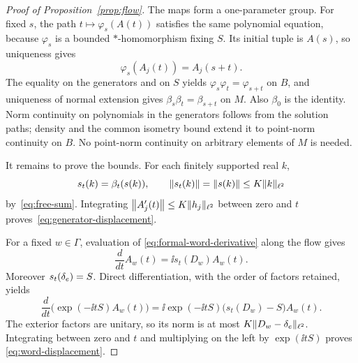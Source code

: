 \begin{proof}[Proof of Proposition~\ref{prop:flow}]
The maps form a one-parameter group. For fixed $s$, the path
$t\mapsto\varphi_s(A(t))$ satisfies the same polynomial
equation, because $\varphi_s$ is a bounded $*$-homomorphism
fixing $S$. Its initial tuple is $A(s)$, so uniqueness gives
\[
 \varphi_s(A_j(t))=A_j(s+t).
\]
The equality on the generators and on $S$ yields
$\varphi_s\varphi_t=\varphi_{s+t}$ on $B$, and uniqueness
of normal extension gives $\beta_s\beta_t=\beta_{s+t}$ on
$M$. Also $\beta_0$ is the identity. Norm continuity on
polynomials in the generators follows from the solution
paths; density and the common isometry bound extend it to
point-norm continuity on $B$. No point-norm continuity on
arbitrary elements of $M$ is needed.

It remains to prove the bounds. For each finitely supported
real $k$,
\[
 s_t(k)=\beta_t(s(k)),\qquad
 \left\lVert s_t(k)\right\rVert=\left\lVert s(k)\right\rVert\leq K\|k\|_{\ell^2}
\]
by~\eqref{eq:free-sum}. Integrating
$\left\lVert A_j'(t)\right\rVert\leq K\|h_j\|_{\ell^2}$ between zero and
$t$ proves~\eqref{eq:generator-displacement}.

For a fixed $w\in\Gamma$, evaluation of
\eqref{eq:formal-word-derivative} along the flow gives
\[
 \frac{d}{dt}A_w(t)=\ii s_t(D_w)A_w(t).
\]
Moreover $s_t(\delta_e)=S$. Direct differentiation, with the order
of factors retained, yields
\[
 \frac{d}{dt}\bigl(\exp(-\ii tS)A_w(t)\bigr)
 =\ii\exp(-\ii tS)\bigl(s_t(D_w)-S\bigr)A_w(t).
\]
The exterior factors are unitary, so its norm is at most
$K\|D_w-\delta_e\|_{\ell^2}$. Integrating between zero and $t$
and multiplying on the left by $\exp(\ii tS)$ proves
\eqref{eq:word-displacement}.
\end{proof}
